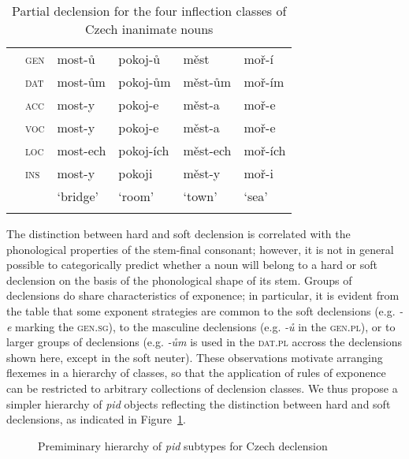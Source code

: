 \documentclass[output=paper]{langsci/langscibook}
\begin{document}
\begin{table}[htb]
\begin{tabular}{ll|ll|ll}
& \scshape gen & most-ů  & pokoj-ů & měst & moř-í\\
& \scshape dat & most-ům &  pokoj-ům &  měst-ům &  moř-ím\\
& \scshape acc & most-y &  pokoj-e &  měst-a &  moř-e\\
& \scshape voc & most-y & pokoj-e & měst-a & moř-e\\
& \scshape loc & most-ech & pokoj-ích & měst-ech &moř-ích\\
& \scshape ins & most-y & pokoji & měst-y & moř-i\\
\midrule
& & `bridge' &  `room' &  `town' &  `sea'\\
\lspbottomrule
\end{tabular}
\caption{Partial declension for the four inflection classes of Czech inanimate nouns}
\label{tab:BonamiCrysmann:CzechNoun}
\end{table}

The distinction between hard and soft declension is correlated with
the phonological properties of the stem-final consonant; however, it is
not in general possible to categorically predict whether a noun will
belong to a hard or soft declension on the basis of the phonological
shape of its stem.  Groups of declensions do share characteristics of exponence; in particular, it is evident from the table that some
exponent strategies are common to the soft declensions (e.g. \emph{-e}
marking the \textsc{gen.sg}), to the masculine declensions
(e.g. \emph{-ů} in the \textsc{gen.pl}), or to larger groups of
declensions (e.g. \emph{-ům} is used in the \textsc{dat.pl} accross
the declensions shown here, except in the soft neuter). These observations
motivate arranging flexemes in a hierarchy of classes, so that the
application of rules of exponence can be restricted to arbitrary
collections of declension classes. We thus propose a simpler hierarchy
of \textit{pid} objects reflecting the distinction between hard and
soft declensions, as indicated in Figure~\ref{fig:BonamiCrysmann:cz:hier}.

\begin{figure}[htb]
\centering\smaller
{}
\begin{tree}
\itshape
{}
\end{tree}
\caption{Premiminary hierarchy of \emph{pid} subtypes for Czech declension\label{fig:BonamiCrysmann:cz:hier}}
\end{figure}
\end{document}
